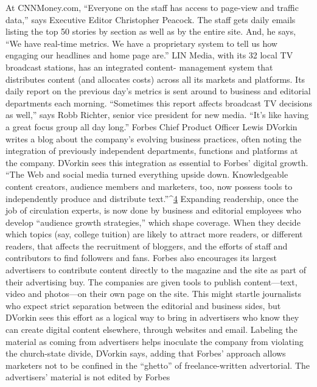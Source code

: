 At CNNMoney.com, ``Everyone on the staff has access to page-view and traffic
data,'' says Executive Editor Christopher Peacock. The staff gets daily emails
listing the top 50 stories by section as well as by the entire site. And, he says, ``We
have real-time metrics. We have a proprietary system to tell us how engaging our
headlines and home page are.''
LIN Media, with its 32 local TV broadcast stations, has an integrated content-
management system that distributes content (and allocates costs) across all
its markets and platforms. Its daily report on the previous day's metrics is sent
around to business and editorial departments each morning. ``Sometimes this
report affects broadcast TV decisions as well,'' says Robb Richter, senior vice
president for new media. ``It's like having a great focus group all day long.''
Forbes Chief Product Officer Lewis DVorkin writes a blog about the company's
evolving business practices, often noting the integration of previously independent
departments, functions and platforms at the company. DVorkin sees
this integration as essential to Forbes' digital growth. ``The Web and social media
turned everything upside down. Knowledgeable content creators, audience
members and marketers, too, now possess tools to independently produce and
distribute text.''^{\href{#endnotes-chapter-9}{4}} Expanding readership, once the job of circulation experts, is
now done by business and editorial employees who develop ``audience growth
strategies,'' which shape coverage. When they decide which topics (say, college
tuition) are likely to attract more readers, or different readers, that affects the recruitment
of bloggers, and the efforts of staff and contributors to find followers
and fans.
Forbes also encourages its largest advertisers to contribute content directly
to the magazine and the site as part of their advertising buy. The companies are
given tools to publish content—text, video and photos—on their own page
on the site. This might startle journalists who expect strict separation between
the editorial and business sides, but DVorkin sees this effort as a logical way to
bring in advertisers who know they can create digital content elsewhere, through
websites and email. Labeling the material as coming from advertisers helps inoculate
the company from violating the church-state divide, DVorkin says, adding
that Forbes' approach allows marketers not to be confined in the ``ghetto''
of freelance-written advertorial. The advertisers' material is not edited by Forbes
